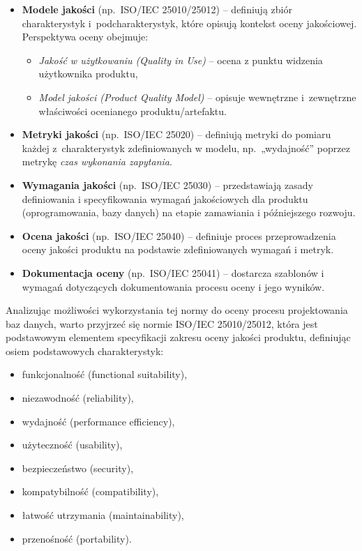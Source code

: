 \begin{itemize}
  \item \textbf{Modele jakości} (np.\ ISO/IEC 25010/25012) -- definiują zbiór charakterystyk i~podcharakterystyk, które opisują kontekst oceny jakościowej. Perspektywa oceny obejmuje:
  \begin{itemize}
    \item \emph{Jakość w użytkowaniu (Quality in Use)} -- ocena z punktu widzenia użytkownika produktu,
    \item \emph{Model jakości (Product Quality Model)} -- opisuje wewnętrzne i~zewnętrzne właściwości ocenianego produktu/artefaktu.
  \end{itemize}
  \item \textbf{Metryki jakości} (np.\ ISO/IEC 25020) -- definiują metryki do pomiaru każdej z~charakterystyk zdefiniowanych w modelu, np.\ „wydajność” poprzez metrykę \emph{czas wykonania zapytania}.
  \item \textbf{Wymagania jakości} (np.\ ISO/IEC 25030) -- przedstawiają zasady definiowania i specyfikowania wymagań jakościowych dla produktu (oprogramowania, bazy danych) na etapie zamawiania i późniejszego rozwoju.
  \item \textbf{Ocena jakości} (np.\ ISO/IEC 25040) -- definiuje proces przeprowadzenia oceny jakości produktu na podstawie zdefiniowanych wymagań i metryk.
  \item \textbf{Dokumentacja oceny} (np.\ ISO/IEC 25041) -- dostarcza szablonów i wymagań dotyczących dokumentowania procesu oceny i jego wyników.
\end{itemize}

Analizując możliwości wykorzystania tej normy do oceny procesu projektowania baz danych, warto przyjrzeć się normie ISO/IEC 25010/25012, która jest podstawowym elementem specyfikacji zakresu oceny jakości produktu, definiując osiem podstawowych charakterystyk:

\begin{itemize}
  \item funkcjonalność (functional suitability),
  \item niezawodność (reliability),
  \item wydajność (performance efficiency),
  \item użyteczność (usability),
  \item bezpieczeństwo (security),
  \item kompatybilność (compatibility),
  \item łatwość utrzymania (maintainability),
  \item przenośność (portability).
\end{itemize}

